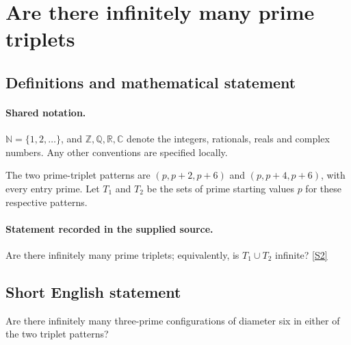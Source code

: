\documentclass[11pt]{article}
\newcommand{\sref}[2]{\hyperlink{source:#1:#2}{[S#2]}}
\begin{document}
\section{Are there infinitely many prime triplets}\label{statement}

\subsection{Definitions and mathematical statement}

\paragraph{Shared notation.}$\mathbb N=\{1,2,\ldots\}$, and $\mathbb Z,\mathbb Q,\mathbb R,\mathbb C$ denote the integers, rationals, reals and complex numbers. Any other conventions are specified locally.


The two prime-triplet patterns are $(p,p+2,p+6)$ and $(p,p+4,p+6)$, with every entry prime. Let $T_1$ and $T_2$ be the sets of prime starting values $p$ for these respective patterns.
\paragraph{Statement recorded in the supplied source.}
Are there infinitely many prime triplets; equivalently, is $T_1\cup T_2$ infinite? \sref{statement}{2}
\subsection{Short English statement}
Are there infinitely many three-prime configurations of diameter six in either of the two triplet patterns?
\end{document}
